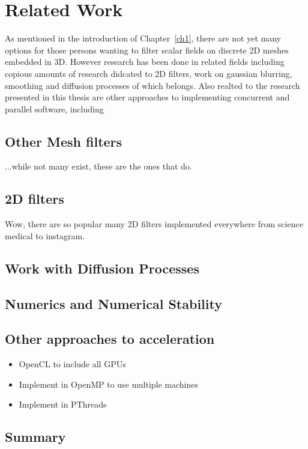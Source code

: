 \chapter{Related Work}
As mentioned in the introduction of Chapter~\ref{ch1}, there are not yet many options for those persons wanting to filter scalar fields on discrete 2D meshes embedded in 3D. However research has been done in related fields including copious amounts of research didcated to 2D filters, work on gaussian blurring, smoothing and diffusion processes of which  belongs. Also realted to the research presented in this thesis are other approaches to implementing concurrent and parallel software, including 

%
%
%
%
\section{Other Mesh filters}
...while not many exist, these are the ones that do.

%
%
%
%
\section{2D filters}
Wow, there are so popular many 2D filters implemented everywhere from science medical to instagram.

%
%
%
%
\section{Work with Diffusion Processes}

%
%
%
%
\section{Numerics and Numerical Stability}

%
%
%
%
\section{Other approaches to acceleration}
\begin{itemize}
	\item OpenCL to include all GPUs
	\item Implement in OpenMP to use multiple machines
	\item Implement in PThreads
\end{itemize}

%
%
%
%
\section{Summary}
%
